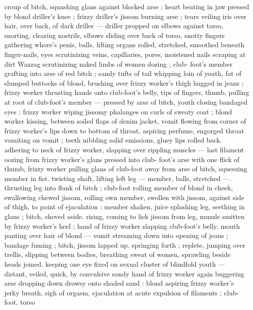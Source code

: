 croup of bitch, squashing glans against blocked arse ; heart beating 
in jaw pressed by blond driller's knee ; frizzy driller's jissom burning 
arse ; tears veiling iris over hair, over back, of dark driller --- driller 
propped on elbows against torso, snorting, clearing nostrils, elbows 
sliding over back of torso, snotty fingers gathering whore's penis, 
balls, lifting organs rolled, stretched, smoothed beneath finger-nails, 
eyes scrutinizing veins, capillaries, pores, moistened nails scraping 
at dirt {\dashslash} Wazzag scrutinizing naked limbs of women dozing ; club- 
foot's member grafting into arse of red bitch ; sandy tufts of tail 
whipping loin of youth, fat of slumped buttocks of blond, brushing 
over frizzy worker's thigh hugged in jeans ; frizzy worker thrusting 
hands onto club-foot's belly, tips of fingers, thumb, pulling at root of 
club-foot's member --- pressed by arse of bitch, youth closing 
bandaged eyes ; frizzy worker wiping jissomy phalanges on curls of 
sweaty coat ; blond worker kissing, between soiled flaps of denim 
jacket, vomit flowing from corner of frizzy worker's lips down to 
bottom of throat, aspiring perfume, engorged throat vomiting on 
vomit ; teeth nibbling solid emissions, gluey lips rolled back. 
adhering to neck of frizzy worker, slapping over rippling muscles --- 
last filament oozing from frizzy worker's glans pressed into club- 
foot's arse {\dashsemi} with one flick of thumb, frizzy worker pulling glans 
of club-foot away from arse of bitch, squeezing member in fist. 
twisting shaft, lifting left leg --- member, balls, stretched ---. 
thrusting leg into flank of bitch ; club-foot rolling member of blond 
in cheek, swallowing chewed jissom, rolling own member, swollen 
with jissom, against side of thigh, to point of ejaculation : member 
shaken, juice splashing leg, seething in glans ; bitch, shoved aside. 
rising, coming to lick jissom from leg, muzzle smitten by frizzy 
worker's heel ; hand of frizzy worker slapping club-foot's belly. 
mouth panting over hair of blond --- vomit streaming down into 
opening of jeans ; bandage fuming ; bitch, jissom lapped up. 
springing forth ; replete, jumping over trellis, slipping between 
bodies, breathing sweat of women, sprawling beside heads joined. 
keeping one eye fixed on sexual cluster of blindfold youth --- 
distant, veiled, quick, by convulsive sandy hand of frizzy worker 
again buggering arse {\dashcom} dropping down drowsy onto shaded sand : 
blond aspiring frizzy worker's jerky breath, sigh of orgasm,
ejaculation at acute expulsion of filaments ; club-foot, torso 
